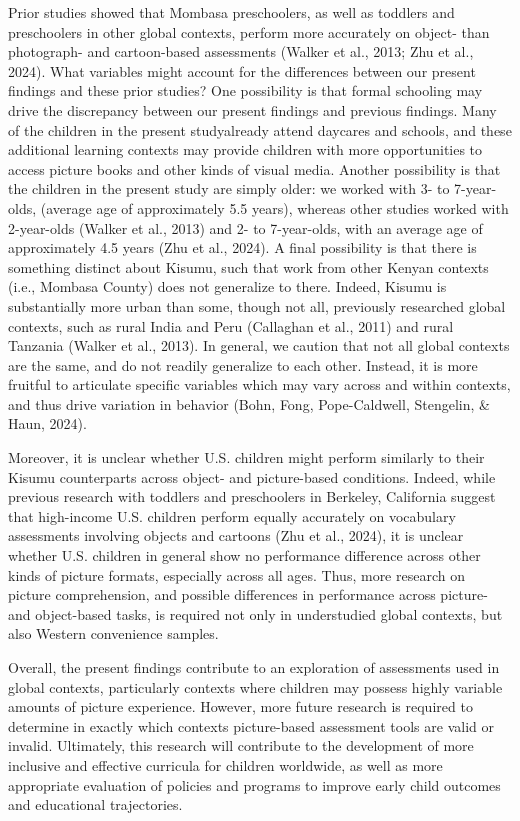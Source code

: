 \documentclass[10pt, letterpaper]{article}
\begin{document}
Prior studies showed that Mombasa preschoolers, as well as toddlers and
preschoolers in other global contexts, perform more accurately on
object- than photograph- and cartoon-based assessments (Walker et al.,
2013; Zhu et al., 2024). What variables might account for the
differences between our present findings and these prior studies? One
possibility is that formal schooling may drive the discrepancy between
our present findings and previous findings. Many of the children in the
present studyalready attend daycares and schools, and these additional
learning contexts may provide children with more opportunities to access
picture books and other kinds of visual media. Another possibility is
that the children in the present study are simply older: we worked with
3- to 7-year-olds, (average age of approximately 5.5 years), whereas
other studies worked with 2-year-olds (Walker et al., 2013) and 2- to
7-year-olds, with an average age of approximately 4.5 years (Zhu et al.,
2024). A final possibility is that there is something distinct about
Kisumu, such that work from other Kenyan contexts (i.e., Mombasa County)
does not generalize to there. Indeed, Kisumu is substantially more urban
than some, though not all, previously researched global contexts, such
as rural India and Peru (Callaghan et al., 2011) and rural Tanzania
(Walker et al., 2013). In general, we caution that not all global
contexts are the same, and do not readily generalize to each other.
Instead, it is more fruitful to articulate specific variables which may
vary across and within contexts, and thus drive variation in behavior
(Bohn, Fong, Pope-Caldwell, Stengelin, \& Haun, 2024).

Moreover, it is unclear whether U.S. children might perform similarly to
their Kisumu counterparts across object- and picture-based conditions.
Indeed, while previous research with toddlers and preschoolers in
Berkeley, California suggest that high-income U.S. children perform
equally accurately on vocabulary assessments involving objects and
cartoons (Zhu et al., 2024), it is unclear whether U.S. children in
general show no performance difference across other kinds of picture
formats, especially across all ages. Thus, more research on picture
comprehension, and possible differences in performance across picture-
and object-based tasks, is required not only in understudied global
contexts, but also Western convenience samples.

Overall, the present findings contribute to an exploration of
assessments used in global contexts, particularly contexts where
children may possess highly variable amounts of picture experience.
However, more future research is required to determine in exactly which
contexts picture-based assessment tools are valid or invalid.
Ultimately, this research will contribute to the development of more
inclusive and effective curricula for children worldwide, as well as
more appropriate evaluation of policies and programs to improve early
child outcomes and educational trajectories.
\end{document}
